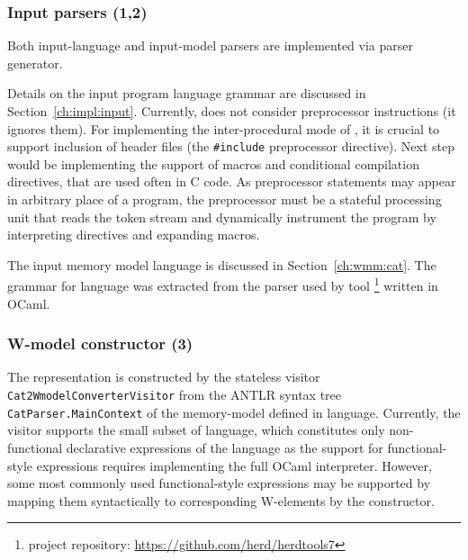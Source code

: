 
\subsubsection{Input parsers (1,2)}
\label{ch:impl:proc:input-parser}

Both input-language and input-model parsers are implemented via  parser generator.

Details on the input program language grammar are discussed in Section~\ref{ch:impl:input}.
Currently, \porthos[2] does not consider preprocessor instructions (it ignores them).
For implementing the inter-procedural mode of \porthos{}, it is crucial to support inclusion of header files (the \texttt{\#include} preprocessor directive).
Next step would be implementing the support of macros and conditional compilation directives, that are used often in C code.
As preprocessor statements may appear in arbitrary place of a program, the preprocessor must be a stateful processing unit that reads the token stream and dynamically instrument the program by interpreting directives and expanding macros.

The input memory model language \cat{} is discussed in Section~\ref{ch:wmm:cat}.
The  grammar for \cat{} language was extracted from the parser used by  tool%
%
\footnote{ project repository: \url{https://github.com/herd/herdtools7}} %
%
written in OCaml.



\subsubsection{W-model constructor (3)}
\label{ch:impl:proc:w-constr}

The \wmodel{} representation is constructed by the stateless visitor \texttt{Cat2WmodelConverterVisitor} from the ANTLR syntax tree \texttt{CatParser.MainContext} of the memory-model defined in \cat{} language.
Currently, the visitor supports the small subset of \cat{} language, which constitutes only non-functional declarative expressions of the language as the support for functional-style expressions requires implementing the full OCaml interpreter.
However, some most commonly used functional-style expressions may be supported by mapping them syntactically to corresponding W-elements by the \wmodel{} constructor.

